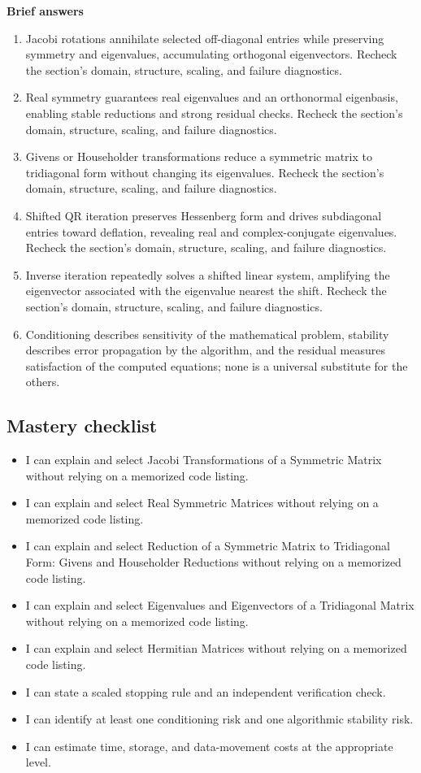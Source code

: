 \documentclass[10pt,letterpaper]{article}
\begin{document}
\textbf{Brief answers}
\begin{enumerate}
\item Jacobi rotations annihilate selected off-diagonal entries while preserving symmetry and eigenvalues, accumulating orthogonal eigenvectors. Recheck the section's domain, structure, scaling, and failure diagnostics.
\item Real symmetry guarantees real eigenvalues and an orthonormal eigenbasis, enabling stable reductions and strong residual checks. Recheck the section's domain, structure, scaling, and failure diagnostics.
\item Givens or Householder transformations reduce a symmetric matrix to tridiagonal form without changing its eigenvalues. Recheck the section's domain, structure, scaling, and failure diagnostics.
\item Shifted QR iteration preserves Hessenberg form and drives subdiagonal entries toward deflation, revealing real and complex-conjugate eigenvalues. Recheck the section's domain, structure, scaling, and failure diagnostics.
\item Inverse iteration repeatedly solves a shifted linear system, amplifying the eigenvector associated with the eigenvalue nearest the shift. Recheck the section's domain, structure, scaling, and failure diagnostics.
\item Conditioning describes sensitivity of the mathematical problem, stability describes error propagation by the algorithm, and the residual measures satisfaction of the computed equations; none is a universal substitute for the others.
\end{enumerate}

\subsection*{Mastery checklist}
\begin{itemize}
\item[$\square$] I can explain and select Jacobi Transformations of a Symmetric Matrix without relying on a memorized code listing.
\item[$\square$] I can explain and select Real Symmetric Matrices without relying on a memorized code listing.
\item[$\square$] I can explain and select Reduction of a Symmetric Matrix to Tridiagonal Form: Givens and Householder Reductions without relying on a memorized code listing.
\item[$\square$] I can explain and select Eigenvalues and Eigenvectors of a Tridiagonal Matrix without relying on a memorized code listing.
\item[$\square$] I can explain and select Hermitian Matrices without relying on a memorized code listing.
\item[$\square$] I can state a scaled stopping rule and an independent verification check.
\item[$\square$] I can identify at least one conditioning risk and one algorithmic stability risk.
\item[$\square$] I can estimate time, storage, and data-movement costs at the appropriate level.
\end{itemize}
\end{document}
